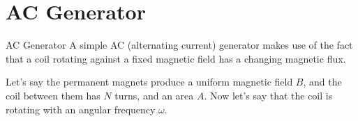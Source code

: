 \documentclass[12pt,aspectratio=169]{beamer}
\begin{document}


\section{AC Generator}

\begin{frame}{AC Generator}
  A simple AC (alternating current) generator makes use of the fact that a 
  coil rotating against a fixed magnetic field has a changing magnetic flux.
  \begin{center}
  \end{center}
  Let's say the permanent magnets produce a uniform magnetic field $B$, and the
  coil between them has $N$ turns, and an area $A$. Now let's say that the coil
  is rotating with an angular frequency $\omega$.
\end{frame}
\end{document}
